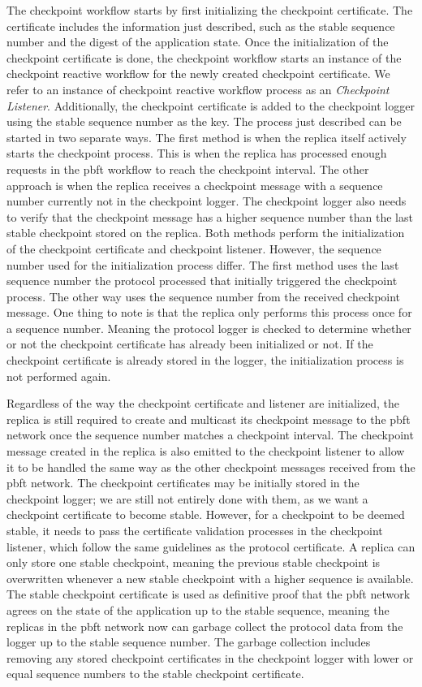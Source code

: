 The checkpoint workflow starts by first initializing the checkpoint certificate. The certificate includes the information just described, such as the stable sequence number and the digest of the application state. Once the initialization of the checkpoint certificate is done, the checkpoint workflow starts an instance of the checkpoint reactive workflow for the newly created checkpoint certificate. 
We refer to an instance of checkpoint reactive workflow process as an \emph{Checkpoint Listener}. Additionally, the checkpoint certificate is added to the checkpoint logger using the stable sequence number as the key. The process just described can be started in two separate ways. The first method is when the replica itself actively starts the checkpoint process. This is when the replica has processed enough requests in the \ac{pbft} workflow to reach the checkpoint interval. The other approach is when the replica receives a checkpoint message with a sequence number currently not in the checkpoint logger. The checkpoint logger also needs to verify that the checkpoint message has a higher sequence number than the last stable checkpoint stored on the replica. Both methods perform the initialization of the checkpoint certificate and checkpoint listener. However,  the sequence number used for the initialization process differ. The first method uses the last sequence number the protocol processed that initially triggered the checkpoint process. The other way uses the sequence number from the received checkpoint message.  One thing to note is that the replica only performs this process once for a sequence number. Meaning the protocol logger is checked to determine whether or not the checkpoint certificate has already been initialized or not. If the checkpoint certificate is already stored in the logger, the initialization process is not performed again.

Regardless of the way the checkpoint certificate and listener are initialized, the replica is still required to create and multicast its checkpoint message to the \ac{pbft} network once the sequence number matches a checkpoint interval. The checkpoint message created in the replica is also emitted to the checkpoint listener to allow it to be handled the same way as the other checkpoint messages received from the \ac{pbft} network. The checkpoint certificates may be initially stored in the checkpoint logger; we are still not entirely done with them, as we want a checkpoint certificate to become stable. However, for a checkpoint to be deemed stable, it needs to pass the certificate validation processes in the checkpoint listener, which follow the same guidelines as the protocol certificate. A replica can only store one stable checkpoint, meaning the previous stable checkpoint is overwritten whenever a new stable checkpoint with a higher sequence is available. 
The stable checkpoint certificate is used as definitive proof that the \ac{pbft} network agrees on the state of the application up to the stable sequence, meaning the replicas in the \ac{pbft} network now can garbage collect the protocol data from the logger up to the stable sequence number. The garbage collection includes removing any stored checkpoint certificates in the checkpoint logger with lower or equal sequence numbers to the stable checkpoint certificate.

